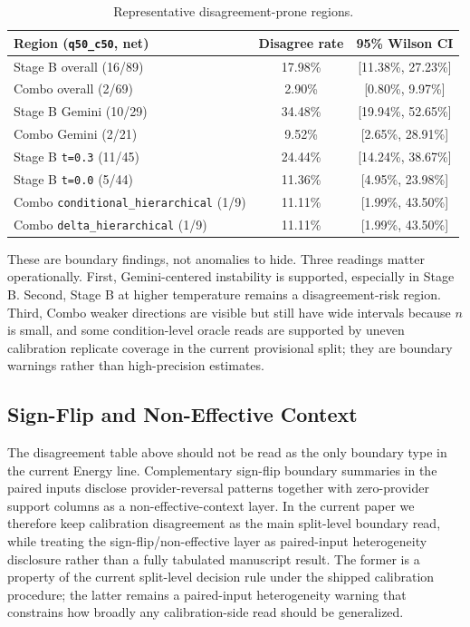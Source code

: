 \documentclass[11pt,a4paper]{article}
\begin{document}
\begin{table}[ht]
\centering
\small
\begin{tabularx}{\textwidth}{@{}Xcc@{}}
\toprule
Region (\texttt{q50\_c50}, net) & Disagree rate & 95\% Wilson CI \\
\midrule
Stage B overall (16/89) & 17.98\% & [11.38\%, 27.23\%] \\
Combo overall (2/69) & 2.90\% & [0.80\%, 9.97\%] \\
Stage B Gemini (10/29) & 34.48\% & [19.94\%, 52.65\%] \\
Combo Gemini (2/21) & 9.52\% & [2.65\%, 28.91\%] \\
Stage B \texttt{t=0.3} (11/45) & 24.44\% & [14.24\%, 38.67\%] \\
Stage B \texttt{t=0.0} (5/44) & 11.36\% & [4.95\%, 23.98\%] \\
Combo \texttt{conditional\_hierarchical} (1/9) & 11.11\% & [1.99\%, 43.50\%] \\
Combo \texttt{delta\_hierarchical} (1/9) & 11.11\% & [1.99\%, 43.50\%] \\
\bottomrule
\end{tabularx}
\caption{Representative disagreement-prone regions.}
\label{tab:boundary_regions}
\end{table}

These are boundary findings, not anomalies to hide. Three readings matter operationally. First, Gemini-centered instability is supported, especially in Stage B. Second, Stage B at higher temperature remains a disagreement-risk region. Third, Combo weaker directions are visible but still have wide intervals because $n$ is small, and some condition-level oracle reads are supported by uneven calibration replicate coverage in the current provisional split; they are boundary warnings rather than high-precision estimates.

\subsection{Sign-Flip and Non-Effective Context}
\label{sec:signflipcontext}

The disagreement table above should not be read as the only boundary type in
the current Energy line. Complementary sign-flip boundary summaries in the
paired inputs disclose provider-reversal patterns together with zero-provider
support columns as a non-effective-context layer. In the current paper we
therefore keep calibration disagreement as the main split-level boundary read,
while treating the sign-flip/non-effective layer as paired-input heterogeneity
disclosure rather than a fully tabulated manuscript result. The former is a
property of the current split-level decision rule under the shipped
calibration procedure; the latter remains a paired-input heterogeneity warning
that constrains how broadly any calibration-side read should be generalized.
\end{document}

